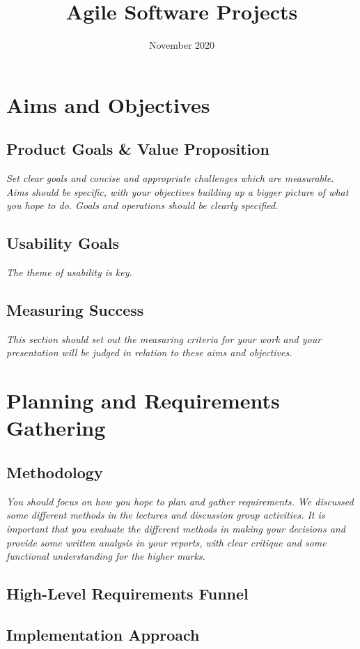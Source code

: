 \documentclass{article}
\title{Agile Software Projects}
\author{}
\date{November 2020}
\begin{document}
\maketitle

\section{Aims and Objectives}
\subsection{Product Goals \& Value Proposition}
\emph{Set clear goals and concise and appropriate challenges which are measurable. Aims should be specific, with your objectives building up a bigger picture of what you hope to do. Goals and operations should be clearly specified.}

\subsection{Usability Goals}
\textit{The theme of usability is key.}

\subsection{Measuring Success}
\textit{This section should set out the measuring criteria for your work and your presentation will be judged in relation to these aims and objectives.}


\section{Planning and Requirements Gathering}
\subsection{Methodology}
\textit{You should focus on how you hope to plan and gather requirements. We discussed some different methods in the lectures and discussion group activities. It is important that you evaluate the different methods in making your decisions and provide some written analysis in your reports, with clear critique and some functional understanding for the higher marks.}
\subsection{High-Level Requirements Funnel}

\subsection{Implementation Approach}
\end{document}
